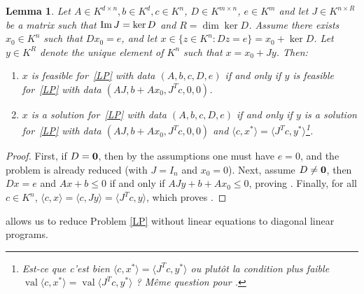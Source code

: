 \documentclass[a4paper,oneside,11pt]{article}
\newtheorem{lemma}[theorem]{Lemma}
\newcommand{\allmat}{\mathbb{M}} %
\newcommand{\simone}[1]{{\color{blue} #1}} %
\DeclareMathOperator{\val}{val}
\newcommand{\OK}{\mathcal{O}_K}
\begin{document}
\begin{lemma}\label{reducD}
  Let $A \in K^{d \times n}, b \in K^d, c\in K^n$, $D \in K^{m\times n}$,
  $e \in K^m$ and let $J \in K^{n \times R}$ be a matrix such that
  ${\rm Im}\, J = \ker D$ and $R = \dim \ker D$.
  Assume there exists $x_0 \in K^n$ such that $D x_0 = e$, and let
  $x \in \{z \in K^n : Dz = e\} = x_0 + \ker D$.
  Let $y \in K^R$ denote the unique element of $K^n$ such that
  $x = x_0 + J y$. Then:
  \begin{enumerate}
  \item\label{reducD_item1}
    $x$ is feasible for~\eqref{LP} with data $(A,b,c,D,e)$ if and only if 
    $y$ is feasible for~\eqref{LP} with data $(AJ,b+A x_0,J^T c,0,0)$.
  \item\label{reducD_item2}
    $x$ is a solution for~\eqref{LP} with data $(A,b,c,D,e)$ if and only if 
    $y$ is a solution for~\eqref{LP} with data $(AJ,b+A x_0,J^T c,0,0)$ and
    $\langle c,x^* \rangle = \langle J^T c,y^* \rangle$\footnote{\simone{Est-ce que
    c'est bien $\langle c,x^* \rangle = \langle J^T c,y^* \rangle$ ou plutôt la condition
    plus faible $\val \langle c,x^* \rangle = \val \langle J^T c,y^* \rangle$ ?
  Même question pour \Cref{solsLP}.}}.
  \end{enumerate}
\end{lemma}
\begin{proof}
  First, if $D={\bf 0}$, then by the assumptions one must have $e=0$, and the problem
  is already reduced (with $J=I_n$ and $x_0=0$).
  Next, assume $D\neq{\bf 0}$, then $Dx=e$ and $Ax + b \le 0$ if and only if
  $AJy + b+Ax_0 \le 0$, proving . Finally, for all
  $c \in K^n$, $\langle c,x\rangle = \langle c, Jy\rangle = \langle J^T c,y\rangle$, which proves .
\end{proof}
 

 allows us to reduce Problem \eqref{LP} without linear equations
to diagonal linear programs.
\end{document}
